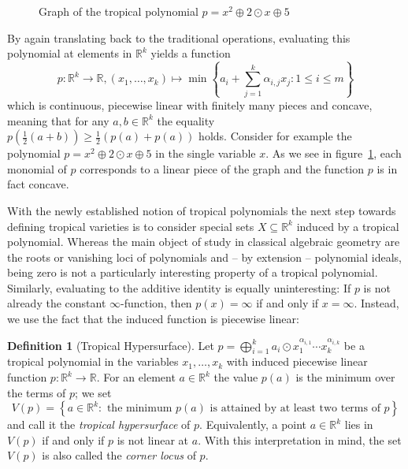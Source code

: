 \documentclass[
  paper=a4,
  titlepage,
  bibliography=totoc,
  listof=totoc,
  pagesize=pdftex
]{scrartcl}
\numberwithin{figure}{section}
\numberwithin{equation}{section}
\numberwithin{table}{section}
\newcommand*\setR{\mathds{R}}
\theoremstyle{definition}
\newtheorem{definition}{Definition}
\numberwithin{definition}{section}
\begin{document}
\begin{figure}[tbh]
  \centering
  \caption{Graph of the tropical polynomial $p=x^2\oplus 2\odot x \oplus 5$}
  \label{fig:tropPolyPlot}
\end{figure}

By again translating back to the traditional operations, evaluating this polynomial at
elements in $\setR^k$ yields a function
\[
  p : \setR^k \to \setR, (x_1, \dots, x_k) \mapsto
  \min\left\{
    a_i + \sum_{j=1}^k \alpha_{i,j}x_j : 1 \leq i \leq m
  \right\}
\]
which is continuous, piecewise linear with finitely many pieces and concave, meaning that
for any $a,b \in \setR^k$ the equality $p(\frac12(a+b)) \geq \frac12(p(a)+p(a))$ holds.
Consider for example the polynomial $p = x^2 \oplus 2\odot x \oplus 5$ in the single
variable $x$. As we see in figure~\ref{fig:tropPolyPlot}, each monomial of $p$ corresponds
to a linear piece of the graph and the function $p$ is in fact concave.

With the newly established notion of tropical polynomials the next step towards defining
tropical varieties is to consider special sets $X \subseteq \setR^k$ induced by a tropical
polynomial. Whereas the main object of study in classical algebraic geometry are the roots
or vanishing loci of polynomials and -- by extension -- polynomial ideals, being zero is
not a particularly interesting property of a tropical polynomial. Similarly, evaluating to
the additive identity is equally uninteresting: If $p$ is not already the constant
$\infty$-function, then $p(x)=\infty$ if and only if $x=\infty$. Instead, we use the fact
that the induced function is piecewise linear:

\begin{definition}[Tropical Hypersurface]
  \label{def:tropHypersurface}
  Let $p = \bigoplus_{i=1}^k a_i \odot x_1^{\alpha_{i,1}}\cdots x_k^{\alpha_{i,k}}$ be a
  tropical polynomial in the variables $x_1, \dots, x_k$ with induced piecewise linear
  function $p:\setR^k \to \setR$. For an element $a\in \setR^k$ the value $p(a)$ is the
  minimum over the terms of $p$; we set
  \[
    V(p) = \left\{
      a \in \setR^k :
      \text{ the minimum $p(a)$ is attained by at least two terms of $p$}
    \right\}
  \]
  and call it the \emph{tropical hypersurface} of $p$. Equivalently, a point $a\in
  \setR^k$ lies in $V(p)$ if and only if $p$ is not linear at $a$. With this
  interpretation in mind, the set $V(p)$ is also called the \emph{corner locus} of $p$.
\end{definition}
\end{document}
